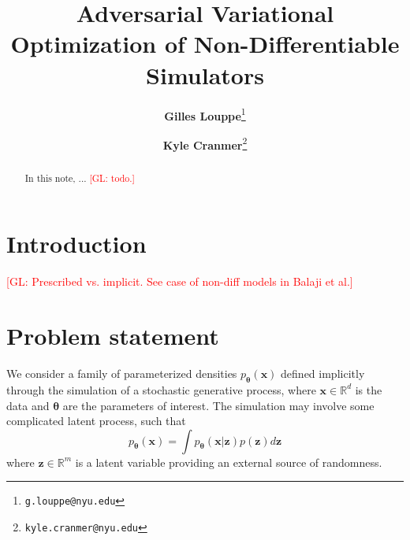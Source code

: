 \documentclass[twocolumn,superscriptaddress,aps]{revtex4-1}
\newcommand{\glnote}[1]{\textcolor{red}{[GL: #1]}}
\theoremstyle{plain}
\begin{document}

\title{\Large{Adversarial Variational Optimization of Non-Differentiable Simulators}}
\vspace{1cm}
\author{\small{\bf Gilles Louppe}\thanks{\texttt{g.louppe@nyu.edu}}}
\author{\small{\bf Kyle Cranmer}\thanks{\texttt{kyle.cranmer@nyu.edu}}}

\begin{abstract}

In this note, ... \glnote{todo.}


\end{abstract}

\maketitle


\section{Introduction}

\glnote{Prescribed vs. implicit. See case of non-diff models in Balaji et al.}



\section{Problem statement}

We consider a family of parameterized densities $p_\mathbf{\theta}(\mathbf{x})$
defined implicitly through the simulation of a stochastic generative
process, where $\mathbf{x} \in \mathbb{R}^d$ is the data and
$\mathbf{\theta}$ are the parameters of interest. The simulation may involve
some complicated latent process, such that
\begin{equation}\label{eqn:p_x}
    p_\mathbf{\theta}(\mathbf{x}) = \int p_\mathbf{\theta}(\mathbf{x}|\mathbf{z}) p(\mathbf{z}) d\mathbf{z}
\end{equation}
where $\mathbf{z} \in \mathbb{R}^m$ is a latent variable providing an external source
of randomness.
\end{document}
